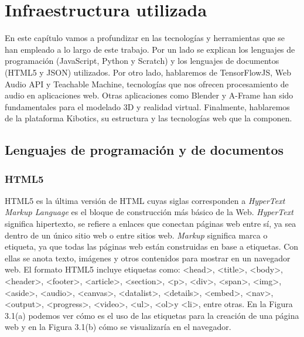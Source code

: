 \chapter{Infraestructura utilizada}
\label{infraestructura}
En este capítulo vamos a profundizar en las tecnologías y herramientas que se han empleado a lo largo de este trabajo. Por un lado se explican los lenguajes de programación (JavaScript, Python y Scratch) y los lenguajes de documentos (HTML5 y JSON) utilizados. Por otro lado, hablaremos de TensorFlowJS, Web Audio API y Teachable Machine, tecnologías que nos ofrecen procesamiento de audio en aplicaciones web. Otras aplicaciones como Blender y A-Frame han sido fundamentales para el  modelado 3D y realidad virtual. Finalmente, hablaremos de la plataforma Kibotics, su estructura y las tecnologías web que la componen.
\section{Lenguajes de programación y de documentos}
\subsection{HTML5}
HTML5 es la última versión de HTML cuyas siglas corresponden a \textit{HyperText Markup Language} es el bloque de construcción más básico de la Web\cite{html}. \textit{HyperText} significa hipertexto, se refiere a enlaces que conectan páginas web entre sí, ya sea dentro de un único sitio web o entre sitios web. 
\textit{Markup} significa marca o etiqueta, ya que todas las páginas web están construidas en base a etiquetas. Con ellas se anota texto, imágenes y otros contenidos para mostrar en un navegador web. El formato HTML5 incluye etiquetas como:  \textless head\textgreater, \textless title\textgreater, \textless body\textgreater, \textless header\textgreater, \textless footer\textgreater, \textless article\textgreater, \textless section\textgreater, \textless p\textgreater, \textless div\textgreater, \textless span\textgreater, \textless img\textgreater, \textless aside\textgreater, \textless audio\textgreater, \textless canvas\textgreater, \textless datalist\textgreater, \textless details\textgreater, \textless embed\textgreater, \textless nav\textgreater, \textless output\textgreater, \textless progress\textgreater, \textless video\textgreater, \textless ul\textgreater, \textless ol\textgreater y \textless li\textgreater, entre otras. En la Figura 3.1(a) podemos ver cómo es el uso de las etiquetas para la creación de una página web y en la Figura 3.1(b) cómo se visualizaría en el navegador.

